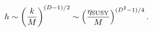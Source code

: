 \begin{equation}
    \label{ha}
    h \sim \left({k\over M}\right)^{(D-1)/2}\sim \left({\eta_{\rm SUSY}\over
    M}\right)^{(D^2-1)/4}.
\end{equation}

